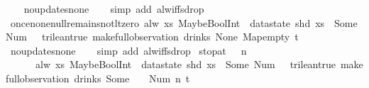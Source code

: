 \begin{isabellebody}
%
\isadelimproof
\ \ %
\endisadelimproof
%
\isatagproof
{}\isamarkupfalse%
\ no{\isacharunderscore}updates{\isacharunderscore}none\isanewline
\ \ \isamarkupfalse%
\ {\isacharparenleft}simp\ add{\isacharcolon}\ alw{\isacharunderscore}iff{\isacharunderscore}sdrop{\isacharparenright}%
\endisatagproof
{\isafoldproof}%
%
\isadelimproof
\isanewline
%
\endisadelimproof
\isanewline
{}\isamarkupfalse%
\ once{\isacharunderscore}none{\isacharunderscore}null{\isacharunderscore}remains{\isacharunderscore}not{\isacharunderscore}lt{\isacharunderscore}zero{\isacharcolon}\ {\isachardoublequoteopen}alw\ {\isacharparenleft}{\isasymlambda}xs{\isachardot}\ MaybeBoolInt\ {\isacharparenleft}{\isacharless}{\isacharparenright}\ {\isacharparenleft}datastate\ {\isacharparenleft}shd\ xs{\isacharparenright}\ {\isacharparenleft}{}{\isacharparenright}{\isacharparenright}\ {\isacharparenleft}Some\ {\isacharparenleft}Num\ {}{\isacharparenright}{\isacharparenright}\ {\isasymnoteq}\ trilean{\isachardot}true{\isacharparenright}\ {\isacharparenleft}make{\isacharunderscore}full{\isacharunderscore}observation\ drinks\ None\ Map{\isachardot}empty\ t{\isacharparenright}{\isachardoublequoteclose}\isanewline
%
\isadelimproof
\ \ %
\endisadelimproof
%
\isatagproof
{}\isamarkupfalse%
\ no{\isacharunderscore}updates{\isacharunderscore}none\isanewline
\ \ \isamarkupfalse%
\ {\isacharparenleft}simp\ add{\isacharcolon}\ alw{\isacharunderscore}iff{\isacharunderscore}sdrop{\isacharparenright}%
\endisatagproof
{\isafoldproof}%
%
\isadelimproof
\isanewline
%
\endisadelimproof
\isanewline
{}\isamarkupfalse%
\ stop{\isacharunderscore}at{\isacharunderscore}{}{\isacharcolon}\ {\isachardoublequoteopen}{}\ {\isasymle}\ n\ {\isasymLongrightarrow}\isanewline
\ \ \ \ \ \ alw\ {\isacharparenleft}{\isasymlambda}xs{\isachardot}\ MaybeBoolInt\ {\isacharparenleft}{\isacharless}{\isacharparenright}\ {\isacharparenleft}datastate\ {\isacharparenleft}shd\ xs{\isacharparenright}\ {\isacharparenleft}{}{\isacharparenright}{\isacharparenright}\ {\isacharparenleft}Some\ {\isacharparenleft}Num\ {}{\isacharparenright}{\isacharparenright}\ {\isasymnoteq}\ trilean{\isachardot}true{\isacharparenright}\ {\isacharparenleft}make{\isacharunderscore}full{\isacharunderscore}observation\ drinks\ {\isacharparenleft}Some\ {}{\isacharparenright}\ {\isacharless}{}\ {\isacharcolon}{\isacharequal}\ Num\ n{\isachargreater}\ t{\isacharparenright}{\isachardoublequoteclose}\isanewline

\end{isabellebody}
